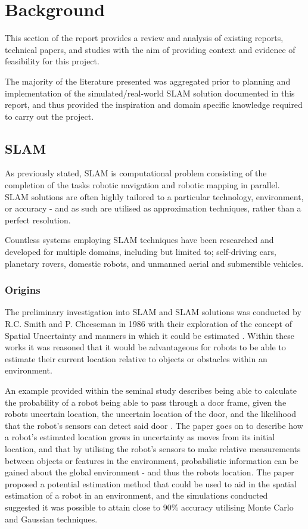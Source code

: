 \section{Background} \label{sec_background}
This section of the report provides a review and analysis of existing reports,
technical papers, and studies with the aim of providing context and evidence
of feasibility for this project.

The majority of the literature presented was aggregated prior to planning and
implementation of the simulated/real-world SLAM solution documented in this
report, and thus provided the inspiration and domain specific knowledge
required to carry out the project.


\subsection{SLAM}
As previously stated, SLAM is computational problem consisting of the
completion of the tasks robotic navigation and robotic mapping in parallel.
SLAM solutions are often highly tailored to a particular technology,
environment, or accuracy - and as such are utilised as approximation
techniques, rather than a perfect resolution.

Countless systems employing SLAM techniques have been researched and developed
for multiple domains, including but limited to; self-driving cars, planetary
rovers, domestic robots, and unmanned aerial and submersible vehicles.

\subsubsection{Origins}
The preliminary investigation into SLAM and SLAM solutions was conducted by
R.C. Smith and P. Cheeseman in 1986 with their exploration of the concept of
Spatial Uncertainty and manners in which it could be estimated
\cite{Smith1986,Smith1988}.
Within these works it was reasoned that it would be advantageous for robots to
be able to estimate their current location relative to objects or obstacles
within an environment.

An example provided within the seminal study describes being
able to calculate the probability of a robot being able to pass through a
door frame, given the robots uncertain location, the uncertain location of the
door, and the likelihood that the robot's sensors can detect said door
\cite{Smith1986}. 
The paper goes on to describe how a robot's estimated location grows in
uncertainty as moves from its initial location, and that by utilising the
robot's sensors to make relative measurements between objects or features in the
environment, probabilistic information can be gained about the global
environment - and thus the robots location.
The paper proposed a potential estimation method that could be used to aid
in the spatial estimation of a robot in an environment, and the simulations
conducted suggested it was possible to attain close to 90\% accuracy utilising
Monte Carlo and Gaussian techniques.

